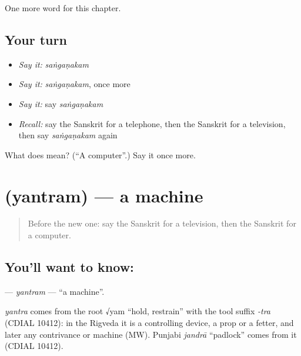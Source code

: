 \begin{grammarlens}[title={What you've built}]
One more word for this chapter.
\end{grammarlens}

\subsection*{Your turn}
\begin{itemize}
\raggedright
  \item \emph{Say it:} \emph{saṅgaṇakam}
  \item \emph{Say it:} \emph{saṅgaṇakam}, once more
  \item \emph{Say it:} say \emph{saṅgaṇakam}
  \item \emph{Recall:} say the Sanskrit for a telephone, then the Sanskrit for a television, then say \emph{saṅgaṇakam} again
\end{itemize}

\begin{tcolorbox}[breakable,colback=teal!4,colframe=teal!35!black,title={Before you move on}]
What does  mean? (\textquotedblleft{}A computer\textquotedblright{}.) Say it once more.
\end{tcolorbox}
\section[\texorpdfstring{\sk{यन्त्रम्} (yantram)}{यन्त्रम् (yantram)}]{ (yantram) — a machine}

\label{lesson:SA-C105-yantram}



\begin{quote}
Before the new one: say the Sanskrit for a television, then the Sanskrit for a computer.
\end{quote}

\subsection*{You'll want to know: }
\textbf{} — \emph{yantram} — \textquotedblleft{}a machine\textquotedblright{}.

\begin{cousinweb}
\emph{yantra} comes from the root √yam \textquotedblleft{}hold, restrain\textquotedblright{} with the tool suffix \emph{-tra} (CDIAL 10412): in the Rigveda it is a controlling device, a prop or a fetter, and later any contrivance or machine (MW). Punjabi \emph{jandrā} \textquotedblleft{}padlock\textquotedblright{} comes from it (CDIAL 10412).
\end{cousinweb}

